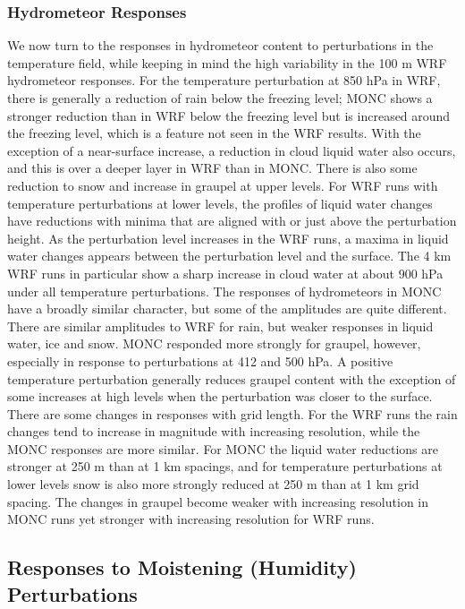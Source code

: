 \documentclass[draft]{agujournal2019}
\begin{document}
\subsubsection{Hydrometeor Responses}

We now turn to the responses in hydrometeor content to perturbations in the
temperature field, while keeping in mind the high variability in the 100 m WRF
hydrometeor responses. For the temperature perturbation at 850 hPa in WRF, there
is generally a reduction of rain below the freezing level; MONC shows a stronger
reduction than in WRF below the freezing level but is increased around the
freezing level, which is a feature not seen in the WRF results. With the
exception of a near-surface increase, a reduction in cloud liquid water also
occurs, and this is over a deeper layer in WRF than in MONC. There is also some
reduction to snow and increase in graupel at upper levels. For WRF runs with
temperature perturbations at lower levels, the profiles of liquid water changes
have reductions with minima that are aligned with or just above the perturbation
height. As the perturbation level increases in the WRF runs, a maxima in liquid
water changes appears between the perturbation level and the surface. The 4 km
WRF runs in particular show a sharp increase in cloud water at about 900 hPa
under all temperature perturbations. The responses of hydrometeors in MONC have
a broadly similar character, but some of the amplitudes are quite different.
There are similar amplitudes to WRF for rain, but weaker responses in liquid
water, ice and snow. MONC responded more strongly for graupel, however,
especially in response to perturbations at 412 and 500 hPa. A positive
temperature perturbation generally reduces graupel content with the exception of
some increases at high levels when the perturbation was closer to the surface.
There are some changes in responses with grid length. For the WRF runs the rain
changes tend to increase in magnitude with increasing resolution, while the MONC
responses are more similar. For MONC the liquid water reductions are stronger at
250 m than at 1 km spacings, and for temperature perturbations at lower levels
snow is also more strongly reduced at 250 m than at 1 km grid spacing. The
changes in graupel become weaker with increasing resolution in MONC runs yet
stronger with increasing resolution for WRF runs. 

\subsection{Responses to Moistening (Humidity) Perturbations}
\end{document}
